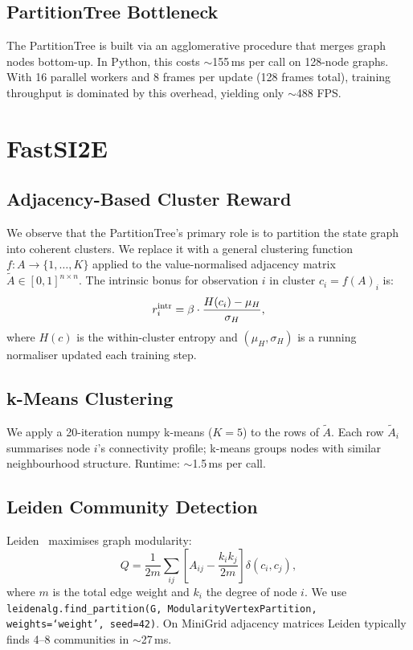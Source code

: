 \documentclass[10pt,twocolumn]{article}
\newcommand{\ptree}{PartitionTree}
\begin{document}
\subsection{PartitionTree Bottleneck}

The \ptree{} is built via an agglomerative procedure that merges graph nodes
bottom-up. In Python, this costs $\sim$155\,ms per call on 128-node graphs.
With 16 parallel workers and 8 frames per update (128 frames total), training
throughput is dominated by this overhead, yielding only $\sim$488 FPS.

\section{FastSI2E}

\subsection{Adjacency-Based Cluster Reward}

We observe that the \ptree{}'s primary role is to partition the state graph into
coherent clusters. We replace it with a general clustering function
$f: A \to \{1,\ldots,K\}$ applied to the value-normalised adjacency matrix
$\tilde{A} \in [0,1]^{n\times n}$. The intrinsic bonus for observation $i$ in
cluster $c_i = f(A)_i$ is:
\[
  r^{\rm intr}_i = \beta \cdot \frac{H(c_i) - \mu_H}{\sigma_H},
\]
where $H(c)$ is the within-cluster entropy and $(\mu_H, \sigma_H)$ is a running
normaliser updated each training step.

\subsection{k-Means Clustering}

We apply a 20-iteration numpy k-means ($K{=}5$) to the rows of $\tilde{A}$.
Each row $\tilde{A}_i$ summarises node $i$'s connectivity profile; k-means groups
nodes with similar neighbourhood structure. Runtime: $\sim$1.5\,ms per call.

\subsection{Leiden Community Detection}

Leiden~\citep{leiden2019} maximises graph modularity:
\[
  Q = \frac{1}{2m}\sum_{ij}\!\left[A_{ij} - \frac{k_i k_j}{2m}\right]
        \delta(c_i, c_j),
\]
where $m$ is the total edge weight and $k_i$ the degree of node $i$.
We use \texttt{leidenalg.find\_partition(G, ModularityVertexPartition,}
\texttt{weights=`weight', seed=42)}. On MiniGrid adjacency matrices Leiden
typically finds 4--8 communities in $\sim$27\,ms.
\end{document}
